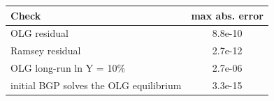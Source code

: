 \begin{tabular}{lc}\toprule Check & max abs. error\\\midrule
OLG residual & 8.8e-10\\
Ramsey residual & 2.7e-12\\
OLG long-run ln Y = 10\% & 2.7e-06\\
initial BGP solves the OLG equilibrium & 3.3e-15\\
\bottomrule\end{tabular}
